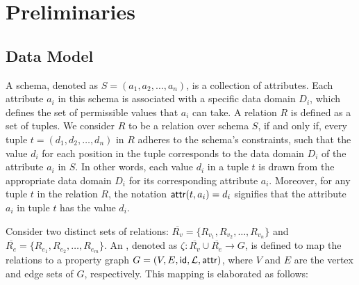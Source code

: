 \section{Preliminaries}
\label{sec:preliminaries}

\subsection{Data Model}
\label{sec:data-model}

A schema, denoted as \(S = (a_1, a_2, \ldots, a_n)\), is a collection of attributes. Each attribute \(a_i\) in this schema is associated with a specific data domain \(D_i\), which defines the set of permissible values that \(a_i\) can take.
A relation \(R\) is defined as a set of tuples. We consider \(R\) to be a relation over schema \(S\), if and only if, every tuple \(t = (d_1, d_2, \ldots, d_n)\) in \(R\) adheres to the schema's constraints, such that the value \(d_i\) for each position in the tuple corresponds to the data domain \(D_i\) of the attribute \(a_i\) in \(S\). In other words, each value \(d_i\) in a tuple \(t\) is drawn from the appropriate data domain \(D_i\) for its corresponding attribute \(a_i\).
Moreover, for any tuple \(t\) in the relation \(R\), the notation \({\mathsf{attr}}(t, a_i) = d_i\) signifies that the attribute \(a_i\) in tuple \(t\) has the value \(d_i\).

Consider two distinct sets of relations: \(\overline{R_v} = \{R_{v_1}, R_{v_2}, \ldots, R_{v_n}\}\) and \(\overline{R_e} = \{R_{e_1}, R_{e_2}, \ldots, R_{e_m}\}\). An \rgmapping, denoted as \(\zeta: \overline{R_v} \cup \overline{R_e} \to G\), is defined to map the relations to a property graph \(G = (V, E, {\mathsf{id}}, \mathcal{L}, {\mathsf{attr}})\), where \(V\) and \(E\) are the vertex and edge sets of \(G\), respectively. This mapping is elaborated as follows:

